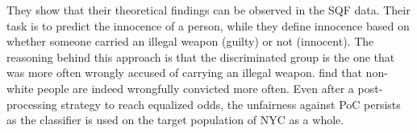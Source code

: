 They show that their theoretical findings can be observed in the SQF data. Their task is to predict the innocence of a person, while they define innocence based on whether someone carried an illegal weapon (guilty) or not (innocent). The reasoning behind this approach is that the discriminated group is the one that was more often wrongly accused of carrying an illegal weapon. \cite{kallus2018} find that non-white people are indeed wrongfully convicted more often. Even after a post-processing strategy to reach equalized odds, the unfairness against PoC persists as the classifier is used on the target population of NYC as a whole.



